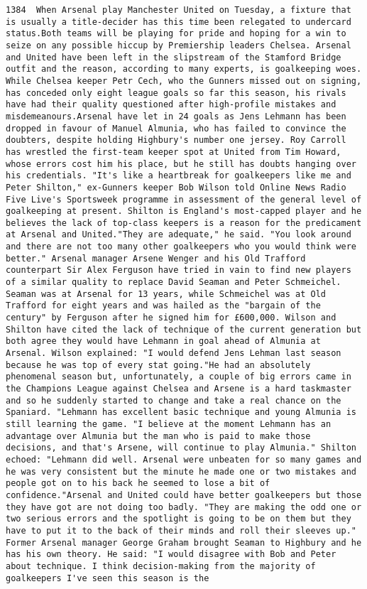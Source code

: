 \documentclass[11pt]{article}
\begin{document}
\begin{Verbatim}[commandchars=\\\{\}]
         1384  When Arsenal play Manchester United on Tuesday, a fixture that is usually a title-decider has this time been relegated to undercard status.Both teams will be playing for pride and hoping for a win to seize on any possible hiccup by Premiership leaders Chelsea. Arsenal and United have been left in the slipstream of the Stamford Bridge outfit and the reason, according to many experts, is goalkeeping woes. While Chelsea keeper Petr Cech, who the Gunners missed out on signing, has conceded only eight league goals so far this season, his rivals have had their quality questioned after high-profile mistakes and misdemeanours.Arsenal have let in 24 goals as Jens Lehmann has been dropped in favour of Manuel Almunia, who has failed to convince the doubters, despite holding Highbury's number one jersey. Roy Carroll has wrestled the first-team keeper spot at United from Tim Howard, whose errors cost him his place, but he still has doubts hanging over his credentials. "It's like a heartbreak for goalkeepers like me and Peter Shilton," ex-Gunners keeper Bob Wilson told Online News Radio Five Live's Sportsweek programme in assessment of the general level of goalkeeping at present. Shilton is England's most-capped player and he believes the lack of top-class keepers is a reason for the predicament at Arsenal and United."They are adequate," he said. "You look around and there are not too many other goalkeepers who you would think were better." Arsenal manager Arsene Wenger and his Old Trafford counterpart Sir Alex Ferguson have tried in vain to find new players of a similar quality to replace David Seaman and Peter Schmeichel. Seaman was at Arsenal for 13 years, while Schmeichel was at Old Trafford for eight years and was hailed as the "bargain of the century" by Ferguson after he signed him for £600,000. Wilson and Shilton have cited the lack of technique of the current generation but both agree they would have Lehmann in goal ahead of Almunia at Arsenal. Wilson explained: "I would defend Jens Lehman last season because he was top of every stat going."He had an absolutely phenomenal season but, unfortunately, a couple of big errors came in the Champions League against Chelsea and Arsene is a hard taskmaster and so he suddenly started to change and take a real chance on the Spaniard. "Lehmann has excellent basic technique and young Almunia is still learning the game. "I believe at the moment Lehmann has an advantage over Almunia but the man who is paid to make those decisions, and that's Arsene, will continue to play Almunia." Shilton echoed: "Lehmann did well. Arsenal were unbeaten for so many games and he was very consistent but the minute he made one or two mistakes and people got on to his back he seemed to lose a bit of confidence."Arsenal and United could have better goalkeepers but those they have got are not doing too badly. "They are making the odd one or two serious errors and the spotlight is going to be on them but they have to put it to the back of their minds and roll their sleeves up." Former Arsenal manager George Graham brought Seaman to Highbury and he has his own theory. He said: "I would disagree with Bob and Peter about technique. I think decision-making from the majority of goalkeepers I've seen this season is the 
\end{Verbatim}
\end{document}
